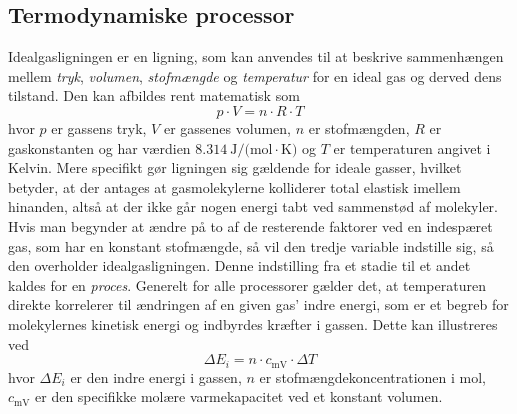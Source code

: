 \documentclass[SRC.tex]{subfiles}
\begin{document}
	\subsection{Termodynamiske processor}
	Idealgasligningen er en ligning, som kan anvendes til at beskrive sammenhængen mellem
	\textit{tryk}, \textit{volumen}, \textit{stofmængde} og \textit{temperatur} for en ideal 
	gas og derved dens tilstand. Den kan afbildes rent matematisk som
	\begin{equation}
	p \cdot V = n \cdot R \cdot T
	\label{eq:idealgasligningen}
	\end{equation}
	hvor \(p\) er gassens tryk, \(V\) er gassenes volumen, \(n\) er stofmængden, \(R\) er gaskonstanten
	og har værdien \(\SI{8.314}{\joule\per (\mole\cdot\kelvin)} \) og \(T\) er temperaturen angivet i 
	Kelvin. Mere specifikt gør ligningen sig 
	gældende for ideale gasser, hvilket betyder, at der antages at gasmolekylerne kolliderer 
	total elastisk imellem hinanden, altså at der ikke går nogen energi tabt ved sammenstød af 
	molekyler. Hvis man begynder at ændre på to af de resterende faktorer ved en indespæret gas, 
	som har en konstant stofmængde, så vil den tredje variable indstille sig, så den overholder
	idealgasligningen. Denne indstilling fra et stadie til et andet kaldes for en \textit{proces}. 
	Generelt for alle processorer gælder det, at temperaturen direkte korrelerer til ændringen af 
	en given gas' indre energi, som er et begreb for molekylernes kinetisk energi og indbyrdes 
	kræfter i gassen. Dette kan illustreres ved
	\begin{equation}
	\Delta E_i = n \cdot c_{\text{mV}} \cdot \Delta T
	\label{eq:2}
	\end{equation}
	hvor \(\Delta E_i\) er den indre energi i gassen, \(n\) er stofmængdekoncentrationen i mol, 
	\(c_{\text{mV}}\) er den specifikke molære varmekapacitet ved et konstant volumen. 
	
\end{document}
